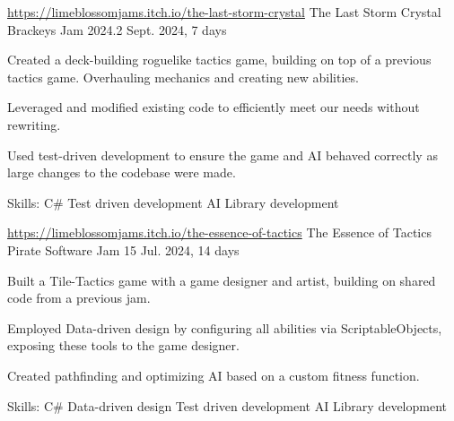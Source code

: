 

\begin{cventries}

 \cventry
 {\href{https://limeblossomjams.itch.io/the-last-storm-crystal}{https://limeblossomjams.itch.io/the-last-storm-crystal}} %
 {The Last Storm Crystal} %
 {Brackeys Jam 2024.2} %
 {Sept. 2024, 7 days} %
 {
     \begin{cvitems} %
       \item {Created a deck-building roguelike tactics game, building on top of a previous tactics game. Overhauling mechanics and creating new abilities.}
       \item {Leveraged and modified existing code to efficiently meet our needs without rewriting.}
       \item {Used test-driven development to ensure the game and AI behaved correctly as large changes to the codebase were made.}
      \item {Skills: C\# \textbullet{} Test driven development \textbullet{} AI \textbullet{} Library development }
     \end{cvitems}
 }

  \cventry
 {\href{https://limeblossomjams.itch.io/the-essence-of-tactics}{https://limeblossomjams.itch.io/the-essence-of-tactics}} %
 {The Essence of Tactics} %
 {Pirate Software Jam 15} %
 {Jul. 2024, 14 days} %
 {
      \begin{cvitems} %
        \item {Built a Tile-Tactics game with a game designer and artist, building on shared code from a previous jam.}
        \item {Employed Data-driven design by configuring all abilities via ScriptableObjects, exposing these tools to the game designer.}
        \item {Created pathfinding and optimizing AI based on a custom fitness function.}
        \item {Skills: C\# \textbullet{} Data-driven design \textbullet{} Test driven development \textbullet{} AI \textbullet{} Library development }
      \end{cvitems}
 }


\end{cventries}

